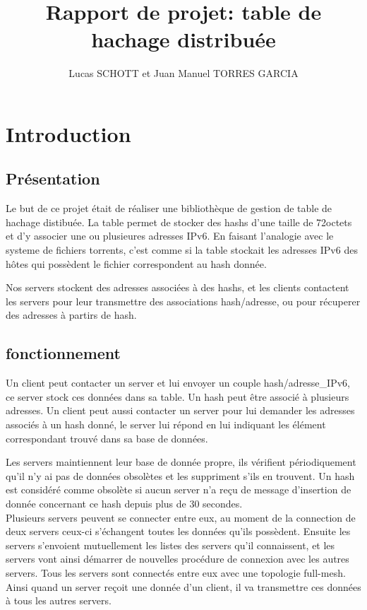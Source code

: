 \documentclass[a4paper,11pt,DIV=12]{scrreprt}
\title{Rapport de projet: table de hachage distribuée}
\author{Lucas SCHOTT et Juan Manuel TORRES GARCIA}
\begin{document}

    \maketitle

    \chapter{Introduction}

    \section{Présentation}

    Le but de ce projet était de réaliser une bibliothèque de gestion de table
    de hachage distibuée. La table permet de stocker des hashs d'une taille
    de 72octets et d'y associer une ou plusieures adresses IPv6. En faisant
    l'analogie avec le systeme de fichiers torrents, c'est comme si la table
    stockait les  adresses IPv6 des hôtes qui possèdent le fichier
    correspondent au hash donnée.

    Nos servers stockent des adresses associées à des hashs, et les clients
    contactent les servers pour leur transmettre des associations
    hash/adresse, ou pour récuperer des adresses à partirs de hash.
    \\

    \section{fonctionnement}

    Un client peut contacter un server et lui envoyer un couple
    hash/adresse\_IPv6, ce server stock ces données dans sa table. Un hash
    peut être associé à plusieurs adresses. Un client peut aussi contacter un
    server pour lui demander les adresses associés à un hash donné, le server
    lui répond en lui indiquant les élément correspondant trouvé dans sa base
    de données.

    Les servers maintiennent leur base de donnée propre, ils vérifient
    périodiquement qu'il n'y ai pas de données obsolètes et les suppriment
    s'ils en trouvent. Un hash est considéré comme obsolète si aucun server
    n'a reçu de message d'insertion de donnée concernant ce hash depuis plus
    de 30 secondes.
    \\

    Plusieurs servers peuvent se connecter entre eux, au moment de la
    connection de deux servers ceux-ci s'échangent toutes les données qu'ils
    possèdent. Ensuite les servers s'envoient mutuellement les listes des
    servers qu'il connaissent, et les servers vont ainsi démarrer de nouvelles
    procédure de connexion avec les autres servers. Tous les servers sont
    connectés entre eux avec une topologie full-mesh. Ainsi quand un server
    reçoit une donnée d'un client, il va transmettre ces données à tous les
    autres servers. 
\end{document}
